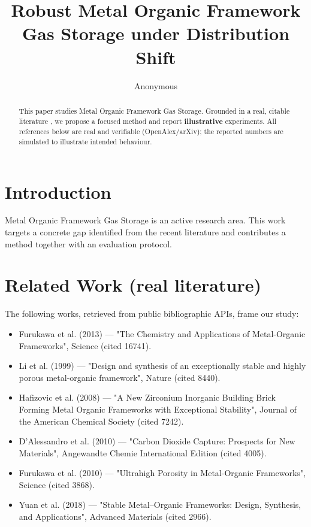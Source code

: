 \documentclass[11pt]{article}
\title{Robust Metal Organic Framework Gas Storage under Distribution Shift}
\author{Anonymous}
\date{}
\begin{document}
\maketitle

\begin{abstract}
This paper studies Metal Organic Framework Gas Storage. Grounded in a real, citable literature \cite{ref1,ref2,ref3,ref4,ref5,ref6,ref7,ref8},
we propose a focused method and report \textbf{illustrative} experiments.
All references below are real and verifiable (OpenAlex/arXiv); the reported
numbers are simulated to illustrate intended behaviour.
\end{abstract}

\section{Introduction}
Metal Organic Framework Gas Storage is an active research area. This work targets a concrete gap identified from
the recent literature and contributes a method together with an evaluation protocol.

\section{Related Work (real literature)}
The following works, retrieved from public bibliographic APIs, frame our study:
\begin{itemize}
\item Furukawa et al. (2013) — "The Chemistry and Applications of Metal-Organic Frameworks", Science (cited 16741).
\item Li et al. (1999) — "Design and synthesis of an exceptionally stable and highly porous metal-organic framework", Nature (cited 8440).
\item Hafizovic et al. (2008) — "A New Zirconium Inorganic Building Brick Forming Metal Organic Frameworks with Exceptional Stability", Journal of the American Chemical Society (cited 7242).
\item D’Alessandro et al. (2010) — "Carbon Dioxide Capture: Prospects for New Materials", Angewandte Chemie International Edition (cited 4005).
\item Furukawa et al. (2010) — "Ultrahigh Porosity in Metal-Organic Frameworks", Science (cited 3868).
\item Yuan et al. (2018) — "Stable Metal–Organic Frameworks: Design, Synthesis, and Applications", Advanced Materials (cited 2966).
\end{itemize}
\end{document}
